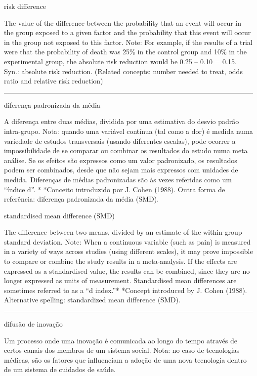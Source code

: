 \documentclass[
  openany]{book}
\begin{document}
risk difference

The value of the difference between the probability that an event will occur in the group exposed to a given factor and the probability that this event will occur in the group not exposed to this factor. Note: For example, if the results of a trial were that the probability of death was 25\% in the control group and 10\% in the experimental group, the absolute risk reduction would be 0.25 -- 0.10 = 0.15. Syn.: absolute risk reduction. (Related concepts: number needed to treat, odds ratio and relative risk reduction)

\begin{center}\rule{0.5\linewidth}{0.5pt}\end{center}

diferença padronizada da média

A diferença entre duas médias, dividida por uma estimativa do desvio padrão intra-grupo. Nota: quando uma variável contínua (tal como a dor) é medida numa variedade de estudos transversais (usando diferentes escalas), pode ocorrer a impossibilidade de se comparar ou combinar os resultados do estudo numa meta análise. Se os efeitos são expressos como um valor padronizado, os resultados podem ser combinados, desde que não sejam mais expressos com unidades de medida. Diferenças de médias padronizadas são às vezes referidas como um ``índice d''. * *Conceito introduzido por J. Cohen (1988). Outra forma de referência: diferença padronizada da média (SMD).

standardised mean difference (SMD)

The difference between two means, divided by an estimate of the within-group standard deviation. Note: When a continuous variable (such as pain) is measured in a variety of ways across studies (using different scales), it may prove impossible to compare or combine the study results in a meta-analysis. If the effects are expressed as a standardised value, the results can be combined, since they are no longer expressed as units of measurement. Standardised mean differences are sometimes referred to as a ``d index.''* *Concept introduced by J. Cohen (1988). Alternative spelling: standardized mean difference (SMD).

\begin{center}\rule{0.5\linewidth}{0.5pt}\end{center}

difusão de inovação

Um processo onde uma inovação é comunicada ao longo do tempo através de certos canais dos membros de um sistema social. Nota: no caso de tecnologias médicas, são os fatores que influenciam a adoção de uma nova tecnologia dentro de um sistema de cuidados de saúde.
\end{document}
